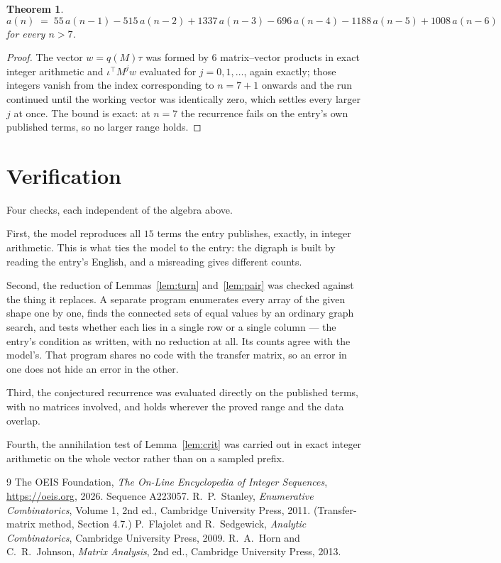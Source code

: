 \documentclass[11pt,a4paper]{article}
\theoremstyle{plain}
\newtheorem{theorem}{Theorem}
\theoremstyle{definition}
\begin{document}
\begin{theorem}
\[
a(n)\;=\;55\,a(n-1) - 515\,a(n-2) + 1337\,a(n-3) - 696\,a(n-4) - 1188\,a(n-5) + 1008\,a(n-6)
\]
for every $n>7$.
\end{theorem}

\begin{proof}
The vector $w=q(M)\tau$ was formed by $6$ matrix--vector products in exact integer
arithmetic and $\iota^{\!\top}M^{j}w$ evaluated for $j=0,1,\dots$, again exactly; those
integers vanish from the index corresponding to $n=7+1$ onwards and the run continued
until the working vector was identically zero, which settles every larger $j$ at once. The bound is exact: at $n=7$ the recurrence fails on the entry's own published terms, so no larger range holds.
\end{proof}

\section{Verification}

Four checks, each independent of the algebra above.

First, the model reproduces all $15$ terms the entry publishes, exactly, in integer
arithmetic. This is what ties the model to the entry: the digraph is built by reading the
entry's English, and a misreading gives different counts.

Second, the reduction of Lemmas~\ref{lem:turn} and~\ref{lem:pair} was checked against the
thing it replaces. A separate program enumerates every array of the given shape one by one,
finds the connected sets of equal values by an ordinary graph search, and tests whether each
lies in a single row or a single column --- the entry's condition as written, with no
reduction at all. Its counts agree with the model's. That program shares no code with the
transfer matrix, so an error in one does not hide an error in the other.

Third, the conjectured recurrence was evaluated directly on the published terms, with no
matrices involved, and holds wherever the proved range and the data overlap.

Fourth, the annihilation test of Lemma~\ref{lem:crit} was carried out in exact integer
arithmetic on the whole vector rather than on a sampled prefix.

\begin{thebibliography}{9}
 The OEIS Foundation, \emph{The On-Line Encyclopedia of Integer
Sequences}, \url{https://oeis.org}, 2026. Sequence A223057.
 R.~P.~Stanley, \emph{Enumerative Combinatorics}, Volume 1, 2nd ed.,
Cambridge University Press, 2011. (Transfer-matrix method, Section 4.7.)
 P.~Flajolet and R.~Sedgewick, \emph{Analytic Combinatorics}, Cambridge
University Press, 2009.
 R.~A.~Horn and C.~R.~Johnson, \emph{Matrix Analysis}, 2nd ed., Cambridge
University Press, 2013.
\end{thebibliography}
\end{document}
